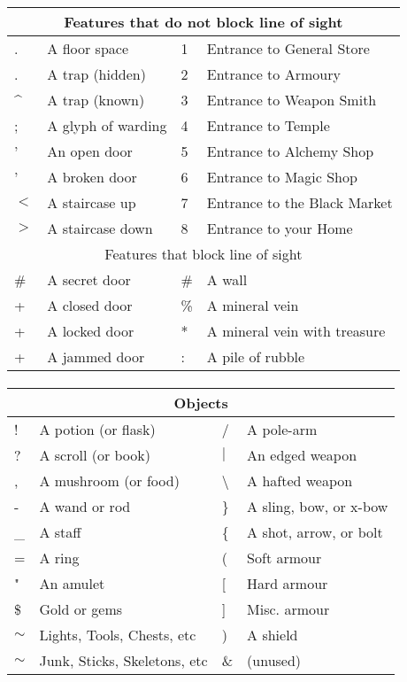 \paragraph{}
\begin{tabular}{|ll|ll|}
\hline
\multicolumn{4}{|c|}{Features that do not block line of sight}\\
\hline
.&A floor space&1&Entrance to General Store\\
.&A trap (hidden)&2&Entrance to Armoury\\
\^{}&A trap (known)&3&Entrance to Weapon Smith\\
;&A glyph of warding&4&Entrance to Temple\\
'&An open door&5&Entrance to Alchemy Shop\\
'&A broken door&6&Entrance to Magic Shop\\
$<$&A staircase up&7&Entrance to the Black Market\\
$>$&A staircase down&8&Entrance to your Home\\
\hline
\multicolumn{4}{|c|}{Features that block line of sight}\\
\hline
\#&A secret door&\#&A wall\\
+&A closed door&\%&A mineral vein\\
+&A locked door&*&A mineral vein with treasure\\
+&A jammed door&:&A pile of rubble\\
\hline
\end{tabular}

\paragraph{}
\begin{tabular}{|ll|ll|}
\multicolumn{4}{|c|}{Objects}\\
\hline
!&A potion (or flask)&/&A pole-arm\\
?&A scroll (or book)&$|$&An edged weapon\\
,&A mushroom (or food)&\textbackslash &A hafted weapon\\
-&A wand or rod&\}&A sling, bow, or x-bow\\
\_&A staff&\{&A shot, arrow, or bolt\\
=&A ring&(&Soft armour\\
"&An amulet&[&Hard armour\\
\$&Gold or gems&]&Misc. armour\\
$\sim$&Lights, Tools, Chests, etc&)&A shield\\
$\sim$&Junk, Sticks, Skeletons, etc&\&&(unused)\\
\hline
\end{tabular}


